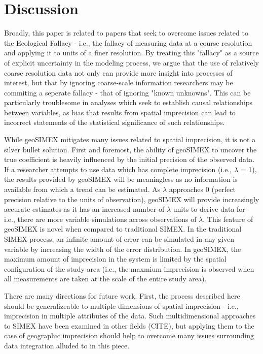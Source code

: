 \section{Discussion}
Broadly, this paper is related to papers that seek to overcome issues related to the Ecological Fallacy - i.e., the fallacy of measuring data at a course resolution and applying it to units of a finer resolution.
By treating this "fallacy" as a source of explicit uncertainty in the modeling process, we argue that the use of relatively coarse resolution data not only can provide more insight into processes of interest, but that by ignoring coarse-scale information researchers may be commiting a seperate fallacy - that of ignoring "known unknowns".
This can be particularly troublesome in analyses which seek to establish causal relationships between variables, as bias that results from spatial imprecision can lead to incorrect statements of the statistical significance of such relationships.
\par
While geoSIMEX mitigates many issues related to spatial imprecision, it is not a silver bullet solution.
First and foremost, the ability of geoSIMEX to uncover the true coefficient is heavily influenced by the initial precision of the observed data.
If a researcher attempts to use data which has complete imprecision (i.e., $\lambda$ = 1), the results provided by geoSIMEX will be meaningless as no information is available from which a trend can be estimated.
As $\lambda$ approaches 0 (perfect precision relative to the units of observation), geoSIMEX will provide increasingly accurate estimates as it has an increased number of $\lambda$ units to derive data for - i.e., there are more variable simulations across observations of $\lambda$.
This feature of geoSIMEX is novel when compared to traditional SIMEX.
In the traditional SIMEX process, an infinite amount of error can be simulated in any given variable by increasing the width of the error distribution.
In geoSIMEX, the maximum amount of imprecision in the system is limited by the spatial configuration of the study area (i.e., the maxmium imprecision is observed when all measurements are taken at the scale of the entire study area).
\par
There are many directions for future work.
First, the process described here should be generalizeable to multiple dimensions of spatial imprecision - i.e., imprecision in multiple attributes of the data.
Such multidimensional approaches to SIMEX have been examined in other fields (CITE), but applying them to the case of geographic imprecision should help to overcome many issues surrounding data integration alluded to in this piece.
